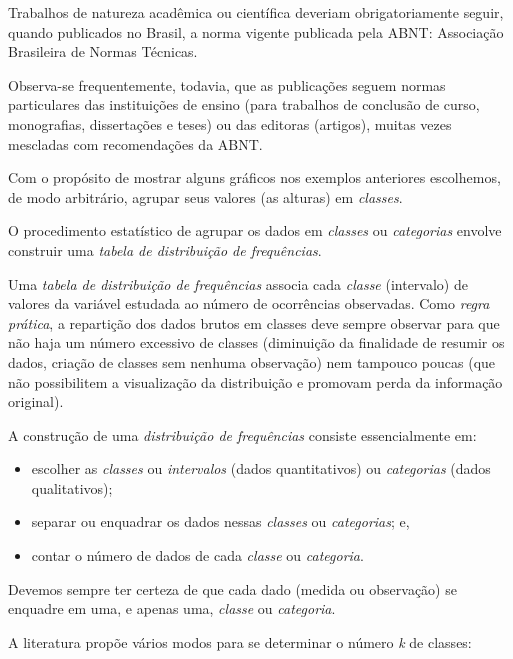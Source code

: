 \documentclass[
]{book}
\providecommand{\tightlist}{%
  \setlength{\itemsep}{0pt}\setlength{\parskip}{0pt}}
\begin{document}
Trabalhos de natureza acadêmica ou científica deveriam obrigatoriamente seguir, quando publicados no Brasil, a norma vigente publicada pela ABNT: Associação Brasileira de Normas Técnicas.

Observa-se frequentemente, todavia, que as publicações seguem normas particulares das instituições de ensino (para trabalhos de conclusão de curso, monografias, dissertações e teses) ou das editoras (artigos), muitas vezes mescladas com recomendações da ABNT.

Com o propósito de mostrar alguns gráficos nos exemplos anteriores escolhemos, de modo arbitrário, agrupar seus valores (as alturas) em \emph{classes}.

O procedimento estatístico de agrupar os dados em \emph{classes} ou \emph{categorias} envolve construir uma \emph{tabela de distribuição de frequências}.

Uma \emph{tabela de distribuição de frequências} associa cada \emph{classe} (intervalo) de valores da variável estudada ao número de ocorrências observadas. Como \emph{regra prática}, a repartição dos dados brutos em classes deve sempre observar para que não haja um número excessivo de classes (diminuição da finalidade de resumir os dados, criação de classes sem nenhuma observação) nem tampouco poucas (que não possibilitem a visualização da distribuição e promovam perda da informação original).

A construção de uma \emph{distribuição de frequências} consiste essencialmente em:

\begin{itemize}
\tightlist
\item
  escolher as \emph{classes} ou \emph{intervalos} (dados quantitativos) ou \emph{categorias} (dados qualitativos);
\item
  separar ou enquadrar os dados nessas \emph{classes} ou \emph{categorias}; e,
\item
  contar o número de dados de cada \emph{classe} ou \emph{categoria}.
\end{itemize}

Devemos sempre ter certeza de que cada dado (medida ou observação) se enquadre em uma, e apenas uma, \emph{classe} ou \emph{categoria}.

A literatura propõe vários modos para se determinar o número \emph{k} de classes:

\hfill\break
\end{document}
